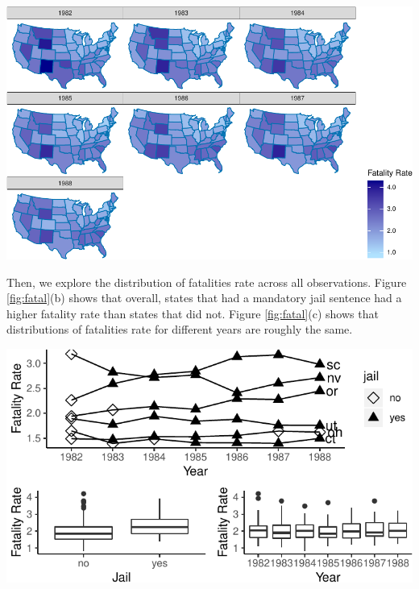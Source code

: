 \documentclass[]{article}
\let\origfigure\figure
\let\endorigfigure\endfigure
\renewenvironment{figure}[1][2] {
    \expandafter\origfigure\expandafter[H]
} {
    \endorigfigure
}
\begin{document}
\begin{figure}
\centering
\includegraphics{team6_final_project_3_files/figure-latex/map-1.pdf}
\caption{\label{fig:map}State traffic fatality rate per 10,000 population in years 1982-1988}
\end{figure}

Then, we explore the distribution of fatalities rate across all observations. Figure \ref{fig:fatal}(b) shows that overall, states that had a mandatory jail sentence had a higher fatality rate than states that did not. Figure \ref{fig:fatal}(c) shows that distributions of fatalities rate for different years are roughly the same.

\begin{figure}
\centering
\includegraphics{team6_final_project_3_files/figure-latex/fatal-1.pdf}
\caption{\label{fig:fatal}(a) Fatality rate for states that changed their policy in the mandatory jail sentence from 1982 to 1988 (b) Boxplot of the fatality rate for different policies in the mandatory jail sentence (c) Boxplot of the fatality rate for different years}
\end{figure}
\end{document}
